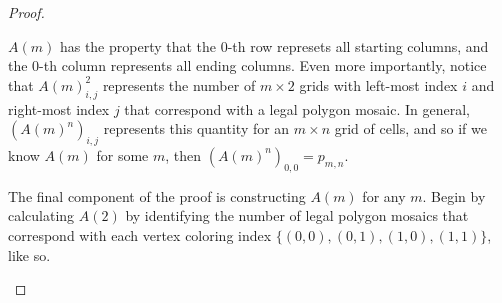 \documentclass[12pt]{article}
\theoremstyle{plain}
\theoremstyle{definition}
\theoremstyle{remark}
\theoremstyle{definition}
\newcommand{\cell}[4]{ \draw[thick] ( #1 , #2 ) rectangle ( #3 , #4 );}
\newcommand{\lablnode}[3]{\node[shape=circle,draw=none,fill=none, inner sep=0pt,minimum size=5pt] (A) at ( #1 , #2 ) {#3};}
\newcommand{\lablvertex}[3]{\node[shape=circle,draw=none,fill=white, inner sep=2pt,minimum size=5pt] (A) at ( #1 , #2 ) {#3};}
\begin{document}
\begin{proof}
\begin{center}
\end{center}

$A(m)$ has the property that the $0$-th row represets all starting columns, and the $0$-th column represents all ending columns. Even more importantly, notice that $A(m)^2_{i,j}$ represents the number of $m \times 2$ grids with left-most index $i$ and right-most index $j$ that correspond with a legal polygon mosaic. In general, $(A(m)^n)_{i,j}$ represents this quantity for an $m \times n$ grid of cells, and so if we know $A(m)$ for some $m$, then $(A(m)^n)_{0,0} = p_{m,n}.$

The final component of the proof is constructing $A(m)$ for any $m$. Begin by  calculating $A(2)$ by identifying the number of legal polygon mosaics that correspond with each vertex coloring index $\{(0,0),(0,1),(1,0),(1,1)\}$, like so.

\begin{center}
\end{center}
\end{proof}
\end{document}

